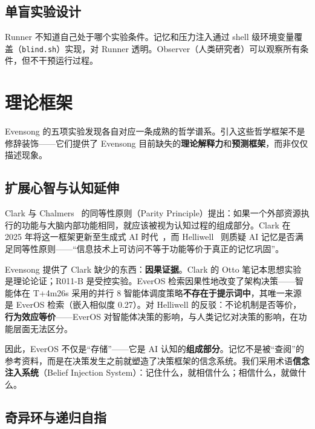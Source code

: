 \documentclass[11pt, a4paper]{article}
\begin{document}
\subsection{单盲实验设计}

Runner 不知道自己处于哪个实验条件。记忆和压力注入通过 shell 级环境变量覆盖（\texttt{blind.sh}）实现，对 Runner 透明。Observer（人类研究者）可以观察所有条件，但不干预运行过程。

\section{理论框架}
\label{sec:theory}

Evensong 的五项实验发现各自对应一条成熟的哲学谱系。引入这些哲学框架不是修辞装饰——它们提供了 Evensong 目前缺失的\textbf{理论解释力}和\textbf{预测框架}，而非仅仅描述现象。

\subsection{扩展心智与认知延伸}
\label{sec:extended-mind}

Clark 与 Chalmers~\cite{clark1998extended} 的同等性原则（Parity Principle）提出：如果一个外部资源执行的功能与大脑内部功能相同，就应该被视为认知过程的组成部分。Clark 在 2025 年将这一框架更新至生成式 AI 时代~\cite{clark2025extending}，而 Helliwell~\cite{helliwell2025extended} 则质疑 AI 记忆是否满足同等性原则——``信息技术上可访问不等于功能等价于真正的记忆巩固''。

Evensong 提供了 Clark 缺少的东西：\textbf{因果证据}。Clark 的 Otto 笔记本思想实验是理论论证；R011-B 是受控实验。EverOS 检索因果性地改变了架构决策——智能体在 T+4m26s 采用的并行 8 智能体调度策略\textbf{不存在于提示词中}，其唯一来源是 EverOS 检索（嵌入相似度 0.27）。对 Helliwell 的反驳：不论机制是否等价，\textbf{行为效应等价}——EverOS 对智能体决策的影响，与人类记忆对决策的影响，在功能层面无法区分。

因此，EverOS 不仅是``存储''——它是 AI 认知的\textbf{组成部分}。记忆不是被``查阅''的参考资料，而是在决策发生之前就塑造了决策框架的信念系统。我们采用术语\textbf{信念注入系统}（Belief Injection System）：记住什么，就相信什么；相信什么，就做什么。

\subsection{奇异环与递归自指}
\label{sec:strange-loops}
\end{document}
